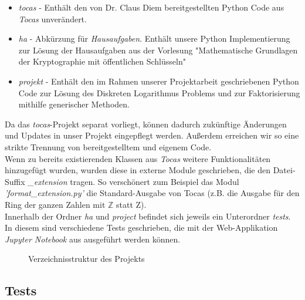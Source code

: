 \documentclass{scrartcl}
\begin{document}
\begin{itemize}
\item \emph{tocas} - Enthält den von Dr. Claus Diem bereitgestellten Python Code aus \emph{Tocas} \cite{tocas} unverändert.

\item \emph{ha} - Abkürzung für \emph{Hausaufgaben}. Enthält unsere Python Implementierung zur Lösung der Hausaufgaben aus der Vorlesung "Mathematische Grundlagen der Kryptographie mit öffentlichen Schlüsseln"
\item \emph{projekt} - Enthält den im Rahmen unserer Projektarbeit geschriebenen Python Code zur Lösung des Diskreten Logarithmus Problems und zur Faktorisierung mithilfe generischer Methoden.
\end{itemize}
Da das \emph{tocas}-Projekt separat vorliegt, können dadurch zukünftige Änderungen und Updates in unser Projekt eingepflegt werden. Außerdem erreichen wir so eine strikte Trennung von bereitgestelltem und eigenem Code.\\
Wenn zu bereits existierenden Klassen aus \emph{Tocas} weitere Funktionalitäten hinzugefügt wurden, wurden diese in externe Module geschrieben, die den Datei-Suffix \emph{\_extension} tragen. So verschönert zum Beispiel das Modul \emph{'format\_extension.py'} die Standard-Ausgabe von Tocas (z.B. die Ausgabe für den Ring der ganzen Zahlen mit \( \mathbb{Z} \) statt Z). \\
Innerhalb der Ordner \emph{ha} und \emph{project} befindet sich jeweils ein Unterordner \emph{tests}. In diesem sind verschiedene Tests geschrieben, die mit der Web-Applikation \emph{Jupyter Notebook} aus \cite{jupyterNotebook} ausgeführt werden können.

\begin{figure}[h]
  \caption{Verzeichnisstruktur des Projekts}
  \label{fig:verzeichnisstruktur}
\end{figure}

\subsection{Tests}
\label{sec:tests}
\end{document}
